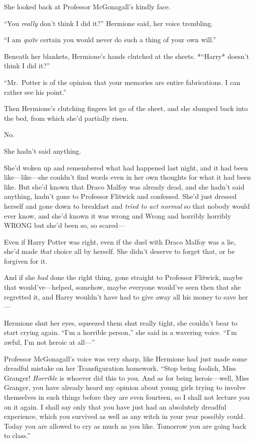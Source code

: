 She looked back at Professor McGonagall's kindly face.

``You \emph{really} don't think I did it?'' Hermione said, her voice
trembling.

``I am \emph{quite} certain you would never do such a thing of your own
will.''

Beneath her blankets, Hermione's hands clutched at the sheets. *``Harry*
doesn't think I did it?''

``Mr.~Potter is of the opinion that your memories are entire
fabrications. I can rather see his point.''

Then Hermione's clutching fingers let go of the sheet, and she slumped
back into the bed, from which she'd partially risen.

No.

She hadn't said anything.

She'd woken up and remembered what had happened last night, and it had
been like---like---she couldn't find words even in her own thoughts for
what it had been like. But she'd known that Draco Malfoy was already
dead, and she hadn't said anything, hadn't gone to Professor Flitwick
and confessed. She'd just dressed herself and gone down to breakfast and
\emph{tried to act normal} so that nobody would ever know, and she'd
known it was wrong and Wrong and horribly horribly WRONG but she'd been
so, so scared---

Even if Harry Potter was right, even if the duel with Draco Malfoy was a
lie, she'd made \emph{that} choice all by herself. She didn't deserve to
forget that, or be forgiven for it.

And if she \emph{had} done the right thing, gone straight to Professor
Flitwick, maybe that would've---helped, somehow, maybe everyone would've
seen then that she regretted it, and Harry wouldn't have had to give
away all his money to save her---

Hermione shut her eyes, squeezed them shut really tight, she couldn't
bear to start crying again. ``I'm a horrible person,'' she said in a
wavering voice. ``I'm awful, I'm not heroic at all---''

Professor McGonagall's voice was very sharp, like Hermione had just made
some dreadful mistake on her Transfiguration homework. ``Stop being
foolish, Miss Granger! \emph{Horrible} is whoever did this to you. And
as for being heroic---well, Miss Granger, you have already heard my
opinion about young girls trying to involve themselves in such things
before they are even fourteen, so I shall not lecture you on it again. I
shall say only that you have just had an absolutely dreadful experience,
which you survived as well as any witch in your year possibly could.
Today you are allowed to cry as much as you like. Tomorrow you are going
back to class.''

